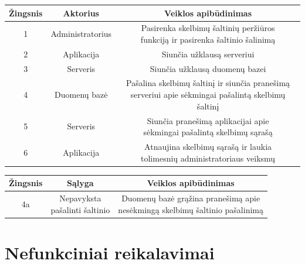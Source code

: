 \documentclass[12pt]{article}
\renewcommand{\thesubsection}{FR\arabic{subsection}}
\renewcommand*{\theenumi}{\thesubsection.\arabic{enumi}}
\renewcommand*{\theenumii}{\thesubsubsection.\theenumi.\arabic{enumii}}
\begin{document}
		\begin{center}
		\begin{tabular}{ | c | c | c | }
			\hline
			Žingsnis & Aktorius         & Veiklos apibūdinimas \\ \hline
			1        & Administratorius & \makecell{Pasirenka skelbimų šaltinių peržiūros \\ funkciją ir pasirenka šaltinio šalinimą} \\ \hline
			2        & Aplikacija       & Siunčia užklausą serveriui \\ \hline
			3        & Serveris         & Siunčia užklausą duomenų bazei \\ \hline
			4        & Duomenų bazė     & \makecell{Pašalina skelbimų šaltinį ir siunčia pranešimą \\ serveriui apie sėkmingai pašalintą skelbimų šaltinį} \\ \hline
			5        & Serveris         & \makecell{Siunčia pranešimą aplikacijai apie \\ sėkmingai pašalintą skelbimų sąrašą} \\ \hline
			6        & Aplikacija       & \makecell{Atnaujina skelbimų sąrašą ir laukia \\ tolimesnių administratoriaus veiksmų} \\ \hline
		\end{tabular}
		\bigskip

		\begin{tabular}{ | c | c | c | }
			\hline
			Žingsnis & Sąlyga         & Veiklos apibūdinimas \\ \hline
			4a       & \makecell{Nepavyksta \\ pašalinti šaltinio} & \makecell{Duomenų bazė grąžina pranešimą apie \\ nesėkmingą skelbimų šaltinio pašalinimą} \\ \hline
		\end{tabular}
		\end{center}	
	\pagebreak
	
	\renewcommand{\thesubsection}{NFR\arabic{subsection}}
	\renewcommand*{\theenumi}{\thesubsection.\arabic{enumi}}
	\renewcommand*{\theenumii}{\theenumi.\arabic{enumii}}
	\section*{Nefunkciniai reikalavimai}
	\setcounter{subsection}{0}
	
\end{document}
